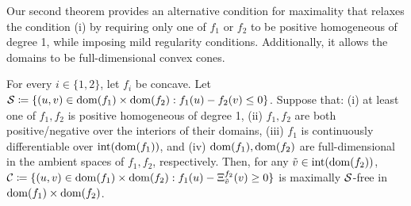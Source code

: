 Our second theorem provides an alternative condition for maximality that relaxes the condition (i) by requiring only one of $f_1$ or $f_2$ to be positive homogeneous of degree 1, while imposing mild regularity conditions. Additionally, it allows the domains to be  full-dimensional convex cones.

\begin{theorem}
\label{thm.max}
	For every $i \in \{1,2\}$, let  $f_i$ be   concave.  Let $\mathcal S \coloneqq \{(u,v) \in \operatorname{dom}(f_1) \times \operatorname{dom}(f_2): f_1(u) - f_2(v) \le 0\}$. Suppose that: (i) at least one  of $f_1,f_2$ is positive homogeneous of degree 1, (ii) $f_1,f_2$ are both positive/negative over the interiors of their domains, (iii) $f_1$ is continuously differentiable over $\operatorname{int}(\operatorname{dom}(f_1))$, and  (iv) $\operatorname{dom}(f_1),\operatorname{dom}(f_2)$ are full-dimensional in the ambient spaces of $f_1,f_2$, respectively. Then, for any $\tilde{v} \in \operatorname{int}(\operatorname{dom}(f_2))$, $\mathcal C \coloneqq \{(u,v) \in \operatorname{dom}(f_1) \times \operatorname{dom}(f_2): f_1(u) -{\Xi^{f_2}_{\tilde{v}}}(v) \ge 0\}$ is maximally $\mathcal S$-free in $\operatorname{dom}(f_1) \times \operatorname{dom}(f_2)$.    
\end{theorem}
